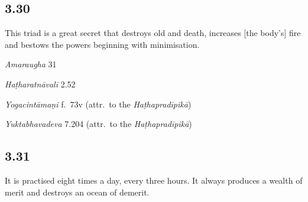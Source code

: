 \begin{ekdosis}
\subsection*{3.30}
\begin{translation}[hp03_030]
This triad is a great secret that destroys old and death, increases [the body's] fire and bestows the powers beginning with minimisation.
\end{translation}

\begin{sources}[hp03_030]
\emph{Amaraugha} 31
\begin{versinnote}
\tl{\var{°guhyaṃ ] °guṇyaṃ \vl}\\!}
\end{versinnote}
\end{sources}

\begin{testimonia}[hp03_030]
\emph{Haṭharatnāvalī} 2.52
\begin{versinnote}
\end{versinnote}

\emph{Yogacintāmaṇi} f.~73v (attr.~to the \emph{Haṭhapradīpikā})
\begin{versinnote}
\end{versinnote}

\emph{Yuktabhavadeva} 7.204 (attr.~to the \emph{Haṭhapradīpikā})
\begin{versinnote}
\end{versinnote}
\end{testimonia}


\subsection*{3.31}
\begin{translation}[hp03_031]
It is practised eight times a day, every three hours. It always produces a wealth of merit and destroys an ocean of demerit.
\end{translation}


\end{ekdosis}
